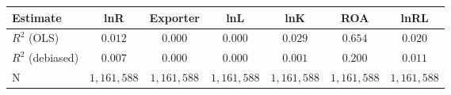 \begin{tabular}{l*{6}{c}}
\hline\hline
 Estimate & lnR & Exporter & lnL & lnK & ROA & lnRL \\
\hline
\addlinespace $ R^2$ (OLS) & $0.012$ & $0.000$ & $0.000$ & $0.029$ & $0.654$ & $0.020$ \\
$ R^2$ (debiased) & $0.007$ & $0.000$ & $0.000$ & $0.001$ & $0.200$ & $0.011$ \\
N & $1,161,588$ & $1,161,588$ & $1,161,588$ & $1,161,588$ & $1,161,588$ & $1,161,588$ \\
\hline\hline
\end{tabular}
